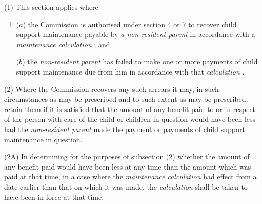 \documentclass[12pt,a4paper]{article}
\begin{document}
(1) This section applies where—
\begin{enumerate}\item[]
($a$) the 
Commission  %
is authorised under section 4
or 7 to recover child support maintenance payable by 
\emph{a non-resident parent}  %
in accordance with a 
\emph{maintenance calculation}%
; and

($b$) the 
\emph{non-resident parent}  %
has failed to make one or more payments of child support maintenance due from him in accordance with that 
\emph{calculation}%
.
\end{enumerate}


(2) Where the 
Commission  %
recovers any such arrears 
it  %
may, in such circumstances as may be prescribed and to such extent as may be prescribed, retain them if 
it  %
is satisfied that the amount of any benefit paid to or in respect of the person with care of the child or children in question would have been less had the 
\emph{non-resident parent}  %
made the payment or payments of child support maintenance in question.

(2A) In determining for the purposes of subsection (2) whether the amount of any benefit paid would have been less at any time than the amount which was paid at that time, in a case where the 
\emph{maintenance calculation}  %
had effect from a date earlier than that on which it was made, the 
\emph{calculation}  %
shall be taken to have been in force at that time.
\end{document}

